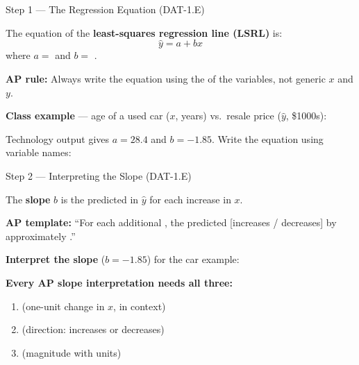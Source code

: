 \documentclass[10pt]{article}
\begin{document}
\vspace{0.1in}

\begin{notesbox}{Step 1 --- The Regression Equation (DAT-1.E)}
\small

\noindent The equation of the \textbf{least-squares regression line (LSRL)} is:
\[
  \hat{y} = a + bx
\]
where \quad $a = $  \quad and \quad $b = $ .

\vspace{6pt}
\textbf{AP rule:} Always write the equation using the  of the variables,
not generic $x$ and $y$.

\vspace{8pt}
\textbf{Class example} --- age of a used car ($x$, years) vs.\ resale price ($\hat{y}$, \$1000s):

\vspace{4pt}
Technology output gives $a = 28.4$ and $b = -1.85$. Write the equation using variable names:

\vspace{6pt}
\hspace{1.5cm} 

\end{notesbox}

\vspace{0.1in}

\begin{notesbox}{Step 2 --- Interpreting the Slope (DAT-1.E)}
\small

\noindent The \textbf{slope} $b$ is the predicted  in $\hat{y}$ for each
 increase in $x$.

\vspace{6pt}
\textbf{AP template:} ``For each additional , the predicted
\ans{[y-variable]} [increases / decreases] by approximately .''

\vspace{8pt}
\textbf{Interpret the slope} ($b = -1.85$) for the car example:
\vspace{4pt}\\

\vspace{6pt}
\textbf{Every AP slope interpretation needs all three:}
\begin{enumerate}[leftmargin=1.8em, itemsep=2pt]
  \item {} \hfill (one-unit change in $x$, in context)
  \item {} \hfill (direction: increases or decreases)
  \item {} \hfill (magnitude with units)
\end{enumerate}

\end{notesbox}
\end{document}
